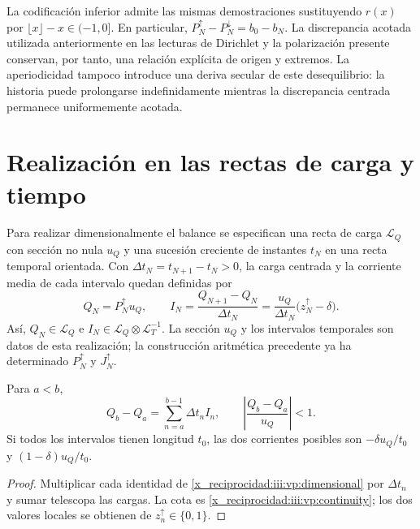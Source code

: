 La codificación inferior admite las mismas demostraciones sustituyendo
$r(x)$ por $\lfloor x\rfloor-x\in(-1,0]$. En particular,
$P_N^{\uparrow}-P_N^{\downarrow}=b_0-b_N$. La discrepancia acotada
utilizada anteriormente en las lecturas de Dirichlet y la polarización
presente conservan, por tanto, una relación explícita de origen y extremos.
La aperiodicidad tampoco introduce una deriva secular de este desequilibrio:
la historia puede prolongarse indefinidamente mientras la discrepancia
centrada permanece uniformemente acotada.

\section{Realización en las rectas de carga y tiempo}

Para realizar dimensionalmente el balance se especifican una recta de carga
$\mathcal L_Q$ con sección no nula $u_Q$ y una sucesión creciente de
instantes $t_N$ en una recta temporal orientada. Con
$\Delta t_N=t_{N+1}-t_N>0$, la carga centrada y la corriente media de
cada intervalo quedan definidas por
\begin{equation}
 Q_N=P_N^{\uparrow}u_Q,\qquad
 I_N=\frac{Q_{N+1}-Q_N}{\Delta t_N}
     =\frac{u_Q}{\Delta t_N}\bigl(z_N^{\uparrow}-\delta\bigr).
 \label{x_reciprocidad:iii:vp:dimensional}
\end{equation}
Así, $Q_N\in\mathcal L_Q$ e
$I_N\in\mathcal L_Q\otimes\mathcal L_T^{-1}$. La sección $u_Q$ y
los intervalos temporales son datos de esta realización; la construcción
aritmética precedente ya ha determinado $P_N^{\uparrow}$ y
$J_N^{\uparrow}$.

\begin{proposition}
Para $a<b$,
\begin{equation}
 Q_b-Q_a=\sum_{n=a}^{b-1}\Delta t_n I_n,
 \qquad
 \left|\frac{Q_b-Q_a}{u_Q}\right|<1.
 \label{x_reciprocidad:iii:vp:dimensional-balance}
\end{equation}
Si todos los intervalos tienen longitud $t_0$, las dos corrientes posibles
son $-\delta u_Q/t_0$ y $(1-\delta)u_Q/t_0$.
\end{proposition}
\begin{proof}
Multiplicar cada identidad de \eqref{x_reciprocidad:iii:vp:dimensional} por
$\Delta t_n$ y sumar telescopa las cargas. La cota es
\eqref{x_reciprocidad:iii:vp:continuity}; los dos valores locales se obtienen de
$z_n^{\uparrow}\in\{0,1\}$.
\end{proof}

